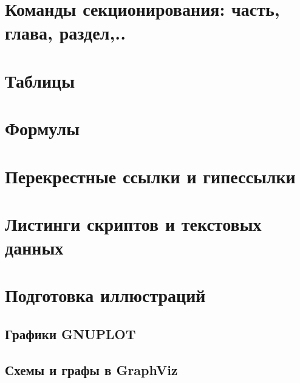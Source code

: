 



\section{Команды секционирования: часть, глава, раздел,..}
\section{Таблицы}
\section{Формулы}
\section{Перекрестные ссылки и гипессылки}
\section{Листинги скриптов и текстовых данных}
\section{Подготовка иллюстраций}
\subsection{Графики GNUPLOT}
\subsection{Схемы и графы в GraphViz}
